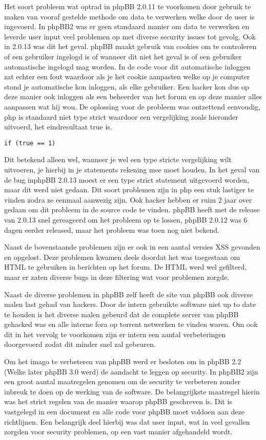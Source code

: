 Het soort probleem wat optrad in phpBB 2.0.11 te voorkomen door gebruik te maken van vooraf gestelde methode om data te verwerken welke door de user is ingevoerd. In phpBB2 was er geen standaard manier om data te verwerken en leverde user input veel problemen op met diverse security issues tot gevolg. Ook in 2.0.13 was dit het geval. phpBB maakt gebruik van cookies om te controleren of een gebruiker ingelogd is of wanneer dit niet het geval is of een gebruiker automatische ingelogd mag worden. In de code voor dit automatische inloggen zat echter een fout waardoor als je het cookie aanpasten welke op je computer stond je automatische kon inloggen, als elke gebruiker. Een hacker kon dus op deze manier ook inloggen als een beheerder van het forum en op deze manier alles aanpassen wat hij wou. De oplossing voor de probleem was ontzettend eenvoudig, php is standaard niet type strict waardoor een vergelijking zoals hieronder uitvoerd, het eindresultaat true is.
\begin{lstlisting}
if (true == 1)
\end{lstlisting}
Dit betekend alleen wel, wanneer je wel een type stricte vergelijking wilt uitvoeren, je hierbij in je statements rekening mee moet houden. In het geval van de bug inphpBB 2.0.13 moest er een type strict statement uitgevoerd worden, maar dit werd niet gedaan. Dit soort problemen zijn in php een stuk lastiger te vinden zodra ze eenmaal aanwezig zijn. Ook hacker hebben er ruim 2 jaar over gedaan om dit probleem in de source code te vinden. phpBB heeft met de release van 2.0.13 snel gereageerd om het probleem op te lossen, phpBB 2.0.12 was 6 dagen eerder released, maar het probleem was toen nog niet bekend.

Naast de bovenstaande problemen zijn er ook in een aantal versies XSS gevonden en opgelost. Deze problemen kwamen deels doordat het was toegestaan om HTML te gebruiken in berichten op het forum. De HTML werd wel gefilterd, maar er zaten diverse bugs in deze filtering wat voor problemen zorgde.

Naast de diverse problemen in phpBB zelf heeft de site van phpBB ook diverse malen last gehad van hackers. Door de intern gebruikte software niet up to date te houden is het diverse malen gebeurd dat de complete server van phpBB gehacked was en alle interne fora op torrent netwerken te vinden waren. Om ook dit in het vervolg te voorkomen zijn er intern een aantal verbeteringen doorgevoerd zodat dit minder snel zal gebeuren.

Om het imago te verbeteren van phpBB werd er besloten om in phpBB 2.2 (Welke later phpBB 3.0 werd\cite{bib.phpbb.2word3}) de aandacht te leggen op security. In phpBB2 zijn een groot aantal maatregelen genomen om de security te verbeteren zonder inbreuk te doen op de werking van de software. De belangrijkste maatregel hierin was het strict regelen van de manier waarop phpBB geschreven is. Dit is vastgelegd in een document\cite{bib.phpbb.codingguidelines} en alle code voor phpBB moet voldoen aan deze richtlijnen. Een belangrijk deel hierbij was dat user input, wat in veel gevallen zorgden voor security problemen, op een vast manier afgehandeld wordt.

